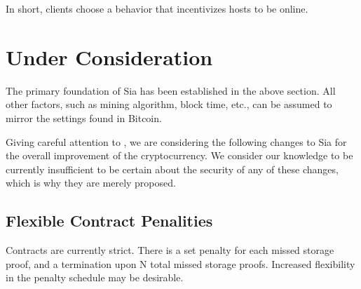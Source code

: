 \documentclass[twocolumn]{article}
\begin{document}
In short, clients choose a behavior that incentivizes hosts to be online.



\section{Under Consideration}
The primary foundation of Sia has been established in the above section.
All other factors, such as mining algorithm, block time, etc., can be assumed to mirror the settings found in Bitcoin.

Giving careful attention to \cite{alts}, we are considering the following changes to Sia for the overall improvement of the cryptocurrency.
We consider our knowledge to be currently insufficient to be certain about the security of any of these changes, which is why they are merely proposed.

\subsection{Flexible Contract Penalities}
Contracts are currently strict.
There is a set penalty for each missed storage proof, and a termination upon N total missed storage proofs.
Increased flexibility in the penalty schedule may be desirable.
\end{document}
